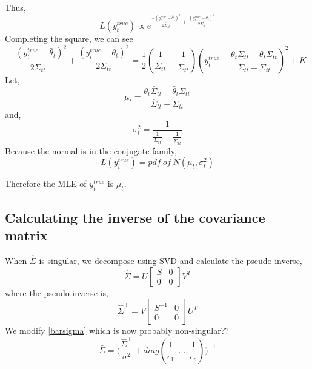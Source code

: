 \documentclass[10pt,a4paper,draft]{article}
\begin{document}
Thus,
\begin{equation}
L(y_t^{true}) \propto e^{ \frac{-(y_t^{true} - \bar{\theta}_t)^2}{2\bar{\Sigma}_{tt}} + \frac{(y_t^{true} - \theta_t)^2}{2\Sigma_{tt}} }
\end{equation}
Completing the square, we can see
\begin{equation}
\frac{-(y_t^{true} - \bar{\theta}_t)^2}{2\bar{\Sigma}_{tt}} + \frac{(y_t^{true} - \theta_t)^2}{2\Sigma_{tt}} = \frac{1}{2}(\frac{1}{\Sigma_{tt}} - \frac{1}{\bar{\Sigma}_{tt}}) (y_t^{true} - \frac{\theta_t\bar{\Sigma}_{tt} - \bar{\theta}_t\Sigma_{tt}}{\bar{\Sigma}_{tt}-\Sigma_{tt}})^2 + K
\end{equation}
Let,
\begin{equation}
\mu_t = \frac{\theta_t\bar{\Sigma}_{tt} - \bar{\theta}_t\Sigma_{tt}}{\bar{\Sigma}_{tt}-\Sigma_{tt}}
\end{equation}
and,
\begin{equation}
\sigma^2_t = \frac{1}{\frac{1}{\Sigma_{tt}} - \frac{1}{\bar{\Sigma}_{tt}}}
\end{equation}
Because the normal is in the conjugate family,
\begin{equation}
L(y_t^{true}) = pdf \ of \ N(\mu_t, \sigma^2_t)
\end{equation}

Therefore the MLE of $y_t^{true}$ is $\mu_t$.

\subsection{Calculating the inverse of the covariance matrix}
When $\hat{\Sigma}$ is singular, we decompose using SVD and calculate the pseudo-inverse,
\begin{equation}
\hat{\Sigma} = U 
\begin{bmatrix} S & 0 \\ 0 & 0 \end{bmatrix} V^T
\end{equation}
where the pseudo-inverse is,
\begin{equation}
\hat{\Sigma}^{+} = V \begin{bmatrix} S^{-1} & 0 \\ 0 & 0 \end{bmatrix} U^T
\end{equation}
We modify \ref{barsigma} which is now probably non-singular??
\begin{equation}
\bar{\Sigma} =  \big(\frac{\hat{\Sigma}^{+}}{\sigma^2} + diag(\frac{1}{\epsilon_1},..., \frac{1}{\epsilon_p})\big)^{-1}
\end{equation}
\end{document}
